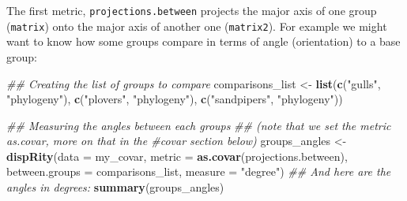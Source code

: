\documentclass[
]{book}
\newenvironment{Shaded}{\begin{snugshade}}{\end{snugshade}}
\newcommand{\CommentTok}[1]{\textcolor[rgb]{0.56,0.35,0.01}{\textit{#1}}}
\newcommand{\DataTypeTok}[1]{\textcolor[rgb]{0.13,0.29,0.53}{#1}}
\newcommand{\DecValTok}[1]{\textcolor[rgb]{0.00,0.00,0.81}{#1}}
\newcommand{\KeywordTok}[1]{\textcolor[rgb]{0.13,0.29,0.53}{\textbf{#1}}}
\newcommand{\NormalTok}[1]{#1}
\newcommand{\OperatorTok}[1]{\textcolor[rgb]{0.81,0.36,0.00}{\textbf{#1}}}
\newcommand{\StringTok}[1]{\textcolor[rgb]{0.31,0.60,0.02}{#1}}
\begin{document}
\begin{Shaded}
\end{Shaded}

The first metric, \texttt{projections.between} projects the major axis of one group (\texttt{matrix}) onto the major axis of another one (\texttt{matrix2}).
For example we might want to know how some groups compare in terms of angle (orientation) to a base group:

\begin{Shaded}
\begin{Highlighting}[]
\CommentTok{\#\# Creating the list of groups to compare}
\NormalTok{comparisons\_list \textless{}{-}}\StringTok{ }\KeywordTok{list}\NormalTok{(}\KeywordTok{c}\NormalTok{(}\StringTok{"gulls"}\NormalTok{, }\StringTok{"phylogeny"}\NormalTok{),}
                         \KeywordTok{c}\NormalTok{(}\StringTok{"plovers"}\NormalTok{, }\StringTok{"phylogeny"}\NormalTok{),}
                         \KeywordTok{c}\NormalTok{(}\StringTok{"sandpipers"}\NormalTok{, }\StringTok{"phylogeny"}\NormalTok{))}

\CommentTok{\#\# Measuring the angles between each groups}
\CommentTok{\#\# (note that we set the metric as.covar, more on that in the \#covar section below)}
\NormalTok{groups\_angles \textless{}{-}}\StringTok{ }\KeywordTok{dispRity}\NormalTok{(}\DataTypeTok{data =}\NormalTok{ my\_covar,}
                          \DataTypeTok{metric =} \KeywordTok{as.covar}\NormalTok{(projections.between),}
                          \DataTypeTok{between.groups =}\NormalTok{ comparisons\_list,}
                          \DataTypeTok{measure =} \StringTok{"degree"}\NormalTok{)}
\CommentTok{\#\# And here are the angles in degrees:}
\KeywordTok{summary}\NormalTok{(groups\_angles)}
\end{Highlighting}
\end{Shaded}
\end{document}
